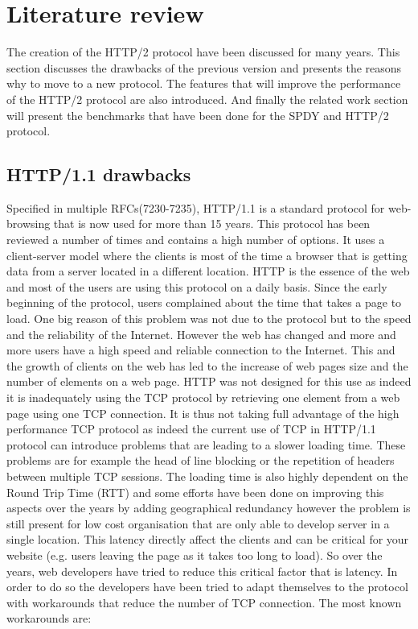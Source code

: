 \section{Literature review}
\label{relwork}
The creation of the HTTP/2 protocol have been discussed for many years. This section discusses the drawbacks of the previous version and presents the reasons why to move to a new protocol. The features that will improve the performance of the HTTP/2 protocol are also introduced. And finally the related work section will present the benchmarks that have been done for the SPDY and HTTP/2 protocol.

\subsection{HTTP/1.1 drawbacks}
Specified in multiple RFCs(7230-7235), HTTP/1.1 is a standard protocol for web-browsing that is now used for more than 15 years. This protocol has been reviewed a number of times and contains a high number of options. It uses a client-server model where the clients is most of the time a browser that is getting data from a server located in a different location. HTTP is the essence of the web and most of the users are using this protocol on a daily basis. 
Since the early beginning of the protocol, users complained about the time that takes a page to load. One big reason of this problem was not due to the protocol but to the speed and the reliability of the Internet. However the web has changed and more and more users have a high speed and reliable connection to the Internet. This and the growth of clients on the web has led to the increase of web pages size and the number of elements on a web page. HTTP was not designed for this use as indeed it is inadequately using the TCP protocol by retrieving one element from a web page using one TCP connection. It is thus not taking full advantage of the high performance TCP protocol as indeed the current use of TCP in HTTP/1.1 protocol can introduce problems that are leading to a slower loading time. These problems are for example the head of line blocking or the repetition of headers between multiple TCP sessions. The loading time is also highly dependent on the Round Trip Time (RTT) and some efforts have been done on improving this aspects over the years by adding geographical redundancy however the problem is still present for low cost organisation that are only able to develop server in a single location. 
This latency directly affect the clients and can be critical for your website (e.g. users leaving the page as it takes too long to load). So over the years, web developers have tried to reduce this critical factor that is latency. In order to do so the developers have been tried to adapt themselves to the protocol with workarounds that reduce the number of TCP connection. The most known workarounds are:
